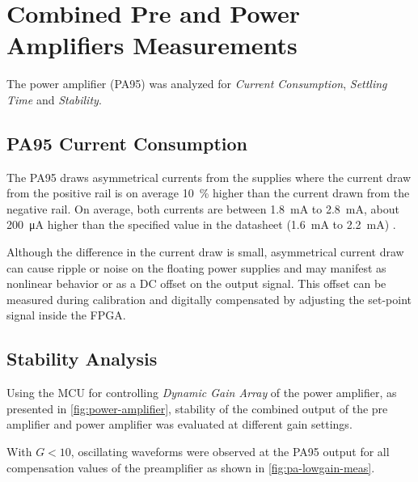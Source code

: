 

\section{Combined Pre and Power Amplifiers Measurements}
\label{sec:combined-preamp-paamp-meas}

The power amplifier (PA95) was analyzed for \emph{Current Consumption},
\emph{Settling Time} and \emph{Stability}.

\subsection{PA95 Current Consumption}

The PA95 draws asymmetrical currents from the supplies where the current draw
from the positive rail is on average \SI{10}{\percent} higher than the
current drawn from the negative rail.
On average, both currents are between \SI{1.8}{\milli\ampere} to
\SI{2.8}{\milli\ampere}, about  \SI{200}{\micro\ampere} higher than the
specified value in the datasheet (\SI{1.6}{\milli\ampere} to
\SI{2.2}{\milli\ampere}) \autocite{apex:pa95}.

Although the difference in the current draw is small, asymmetrical current
draw can cause ripple or
noise on the floating power supplies and may
manifest as nonlinear behavior or as a DC offset on the output signal.
This offset can be measured during calibration and digitally compensated by
adjusting the set-point signal inside the FPGA.

\subsection{Stability Analysis}

Using the \ac{MCU} for controlling \emph{Dynamic Gain Array} of the power
amplifier, as presented in \autoref{fig:power-amplifier}, stability
of the combined output of the pre amplifier and power amplifier was evaluated
at different gain settings.

With $G<10$, oscillating waveforms were observed at the PA95 output for all
compensation values of the preamplifier as shown in
\autoref{fig:pa-lowgain-meas}.

